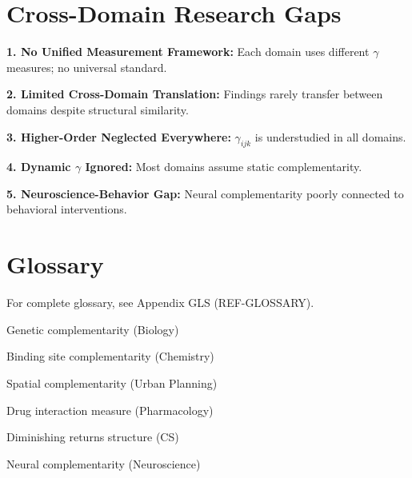 \section{Cross-Domain Research Gaps}
\label{sec:gaps}

\begin{tcolorbox}[colback=red!5!white,colframe=red!75!black,title=\textbf{Identified Research Gaps}]

\textbf{1. No Unified Measurement Framework:}
Each domain uses different $\gamma$ measures; no universal standard.

\textbf{2. Limited Cross-Domain Translation:}
Findings rarely transfer between domains despite structural similarity.

\textbf{3. Higher-Order Neglected Everywhere:}
$\gamma_{ijk}$ is understudied in all domains.

\textbf{4. Dynamic $\gamma$ Ignored:}
Most domains assume static complementarity.

\textbf{5. Neuroscience-Behavior Gap:}
Neural complementarity poorly connected to behavioral interventions.

\end{tcolorbox}

\section{Glossary}
\label{sec:glossary-catalog}

For complete glossary, see Appendix GLS (REF-GLOSSARY).

\begin{description}[noitemsep]
    \item[Epistasis] Genetic complementarity (Biology)
    \item[Cooperativity] Binding site complementarity (Chemistry)
    \item[Agglomeration] Spatial complementarity (Urban Planning)
    \item[Combination Index] Drug interaction measure (Pharmacology)
    \item[Submodularity] Diminishing returns structure (CS)
    \item[Integration] Neural complementarity (Neuroscience)
\end{description}

